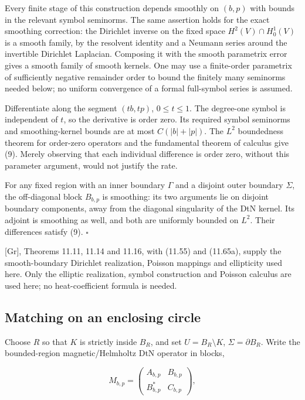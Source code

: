 \documentclass[11pt]{article}
\begin{document}
Every finite stage of this construction depends smoothly on \((b,p)\)
with bounds in the relevant symbol seminorms. The same assertion holds
for the exact smoothing correction: the Dirichlet inverse on the fixed
space \(H^2(V)\cap H_0^1(V)\) is a smooth family, by the resolvent
identity and a Neumann series around the invertible Dirichlet Laplacian.
Composing it with the smooth parametrix error gives a smooth family of
smooth kernels. One may use a finite-order parametrix of sufficiently
negative remainder order to bound the finitely many seminorms needed
below; no uniform convergence of a formal full-symbol series is assumed.

Differentiate along the segment \((tb,tp)\), \(0\leq t\leq1\). The
degree-one symbol is independent of \(t\), so the derivative is order
zero. Its required symbol seminorms and smoothing-kernel bounds are at
most \(C(|b|+|p|)\). The \(L^2\) boundedness theorem for order-zero
operators and the fundamental theorem of calculus give (9). Merely
observing that each individual difference is order zero, without this
parameter argument, would not justify the rate.

For any fixed region with an inner boundary \(\Gamma\) and a disjoint
outer boundary \(\Sigma\), the off-diagonal block \(B_{b,p}\) is
smoothing: its two arguments lie on disjoint boundary components, away
from the diagonal singularity of the DtN kernel. Its adjoint is
smoothing as well, and both are uniformly bounded on \(L^2\). Their
differences satisfy (9). \(\square\)

{[}Gr{]}, Theorems 11.11, 11.14 and 11.16, with (11.55) and (11.65a),
supply the smooth-boundary Dirichlet realization, Poisson mappings and
ellipticity used here. Only the elliptic realization, symbol
construction and Poisson calculus are used here; no heat-coefficient
formula is needed.

\subsection{Matching on an enclosing
circle}\label{matching-on-an-enclosing-circle}

Choose \(R\) so that \(K\) is strictly inside \(B_R\), and set
\(U=B_R\setminus K\), \(\Sigma=\partial B_R\). Write the bounded-region
magnetic/Helmholtz DtN operator in blocks,

\[M_{b,p}=\begin{pmatrix} A_{b,p}&B_{b,p}\\ B_{b,p}^*&C_{b,p}\end{pmatrix},\]
\end{document}
